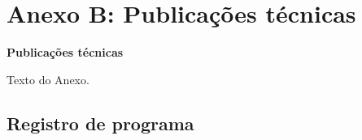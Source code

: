 \chapter{Anexo B: Publicações técnicas}
\label{anex2}
\begin{center}
    \textbf{Publicações técnicas}
\end{center}

Texto do Anexo.


\section{Registro de programa}
